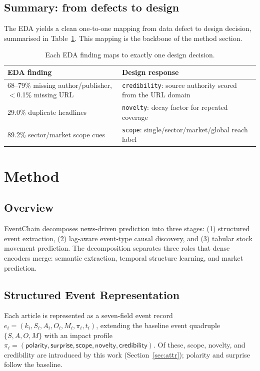 \documentclass[sigconf,nonacm]{acmart}
\begin{document}
\subsection{Summary: from defects to design}
The EDA yields a clean one-to-one mapping from data defect to design
decision, summarised in Table~\ref{tab:mapping}. This mapping is the
backbone of the method section.

\begin{table}[t]
\caption{Each EDA finding maps to exactly one design decision.}
\label{tab:mapping}
\begin{tabular}{p{3.1cm}p{4.4cm}}
\toprule
EDA finding & Design response \\
\midrule
68--79\% missing author/publisher, $<$0.1\% missing URL
 & \texttt{credibility}: source authority scored from the URL domain \\[2pt]
29.0\% duplicate headlines
 & \texttt{novelty}: decay factor for repeated coverage \\[2pt]
89.2\% sector/market scope cues
 & \texttt{scope}: single/sector/market/global reach label \\
\bottomrule
\end{tabular}
\end{table}

\section{Method}
\label{sec:method}

\subsection{Overview}
EventChain decomposes news-driven prediction into three stages:
(1) structured event extraction, (2) lag-aware event-type causal
discovery, and (3) tabular stock movement prediction. The decomposition
separates three roles that dense encoders merge: semantic extraction,
temporal structure learning, and market prediction.

\subsection{Structured Event Representation}
Each article is represented as a seven-field event record
$e_i=(k_i,S_i,A_i,O_i,M_i,\pi_i,t_i)$, extending the baseline event
quadruple $\{S,A,O,M\}$ with an impact profile
$\pi_i=(\textsf{polarity},\textsf{surprise},\textsf{scope},
\textsf{novelty},\textsf{credibility})$. Of these, scope, novelty, and
credibility are introduced by this work (Section~\ref{sec:attr});
polarity and surprise follow the baseline.
\end{document}
